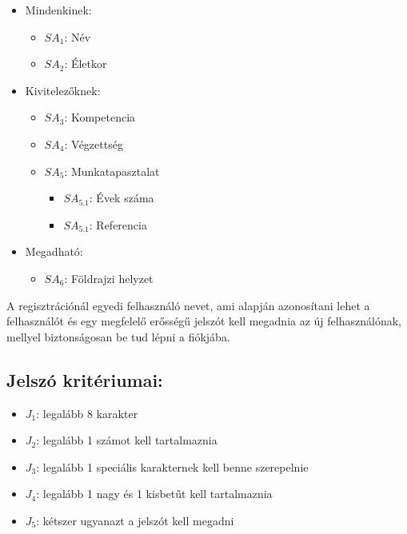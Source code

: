 \begin{itemize}
    \item Mindenkinek:
    \begin{itemize}
        \item ${SA}_1$: Név
        \item ${SA}_2$: Életkor
    \end{itemize}
    \item Kivitelezőknek:
    \begin{itemize}
        \item ${SA}_3$: Kompetencia
        \item ${SA}_4$: Végzettség
        \item ${SA}_5$: Munkatapasztalat
        \begin{itemize}
            \item ${SA}_{5.1}$: Évek száma
            \item ${SA}_{5.1}$: Referencia
        \end{itemize}
    \end{itemize}
    
    \item Megadható:
    \begin{itemize}
        \item ${SA}_6$: Földrajzi helyzet
    \end{itemize}
\end{itemize}

A regisztrációnál egyedi felhasználó nevet, ami alapján azonosítani lehet a felhasználót és egy megfelelő erősségű jelszót kell megadnia az új felhasználónak, mellyel biztonságosan be tud lépni a fiókjába.

\subsection{Jelszó kritériumai:}

\begin{itemize}
    \item $J_1$: legalább 8 karakter
    \item $J_2$: legalább 1 számot kell tartalmaznia
    \item $J_3$: legalább 1 speciális karakternek kell benne szerepelnie
    \item $J_4$: legalább 1 nagy és 1 kisbetűt kell tartalmaznia
    \item $J_5$: kétszer ugyanazt a jelszót kell megadni
\end{itemize}

